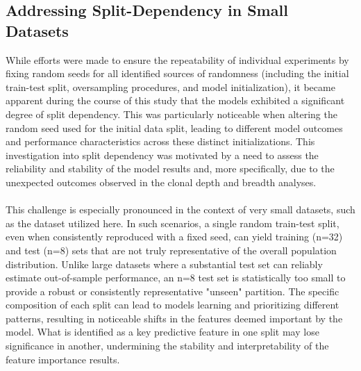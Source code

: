 \documentclass[12pt,a4paper]{report}
\begin{document}
\subsection{Addressing Split-Dependency in Small Datasets}
\noindent
While efforts were made to ensure the repeatability of individual experiments by fixing random seeds for all identified sources of randomness (including the initial train-test split, oversampling procedures, and model initialization), it became apparent during the course of this study that the models exhibited a significant degree of split dependency. This was particularly noticeable when altering the random seed used for the initial data split, leading to different model outcomes and performance characteristics across these distinct initializations. This investigation into split dependency was motivated by a need to assess the reliability and stability of the model results and, more specifically, due to the unexpected outcomes observed in the clonal depth and breadth analyses.\\
\\
This challenge is especially pronounced in the context of very small datasets, such as the dataset utilized here. In such scenarios, a single random train-test split, even when consistently reproduced with a fixed seed, can yield training (n=32) and test (n=8) sets that are not truly representative of the overall population distribution. Unlike large datasets where a substantial test set can reliably estimate out-of-sample performance, an n=8 test set is statistically too small to provide a robust or consistently representative "unseen" partition. The specific composition of each split can lead to models learning and prioritizing different patterns, resulting in noticeable shifts in the features deemed important by the model. What is identified as a key predictive feature in one split may lose significance in another, undermining the stability and interpretability of the feature importance results.\\
\\
\end{document}
